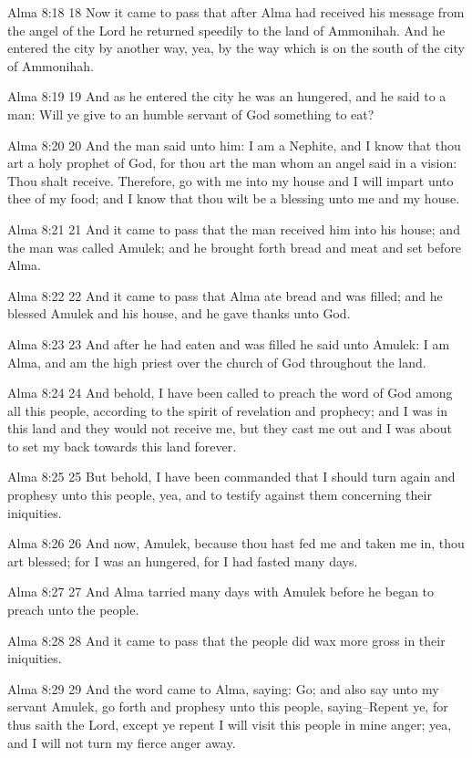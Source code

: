 Alma 8:18
 18 Now it came to pass that after Alma had received his message
from the angel of the Lord he returned speedily to the land of
Ammonihah. And he entered the city by another way, yea, by the
way which is on the south of the city of Ammonihah.

Alma 8:19
 19 And as he entered the city he was an hungered, and he said to
a man: Will ye give to an humble servant of God something to eat?

Alma 8:20
 20 And the man said unto him: I am a Nephite, and I know that
thou art a holy prophet of God, for thou art the man whom an
angel said in a vision: Thou shalt receive. Therefore, go with
me into my house and I will impart unto thee of my food; and I
know that thou wilt be a blessing unto me and my house.

Alma 8:21
 21 And it came to pass that the man received him into his house;
and the man was called Amulek; and he brought forth bread and
meat and set before Alma.

Alma 8:22
 22 And it came to pass that Alma ate bread and was filled; and
he blessed Amulek and his house, and he gave thanks unto God.

Alma 8:23
 23 And after he had eaten and was filled he said unto Amulek: I
am Alma, and am the high priest over the church of God throughout
the land.

Alma 8:24
 24 And behold, I have been called to preach the word of God
among all this people, according to the spirit of revelation and
prophecy; and I was in this land and they would not receive me,
but they cast me out and I was about to set my back towards this
land forever.

Alma 8:25
 25 But behold, I have been commanded that I should turn again
and prophesy unto this people, yea, and to testify against them
concerning their iniquities.

Alma 8:26
 26 And now, Amulek, because thou hast fed me and taken me in,
thou art blessed; for I was an hungered, for I had fasted many
days.

Alma 8:27
 27 And Alma tarried many days with Amulek before he began to
preach unto the people.

Alma 8:28
 28 And it came to pass that the people did wax more gross in
their iniquities.

Alma 8:29
 29 And the word came to Alma, saying: Go; and also say unto my
servant Amulek, go forth and prophesy unto this people,
saying--Repent ye, for thus saith the Lord, except ye repent I
will visit this people in mine anger; yea, and I will not turn my
fierce anger away.

